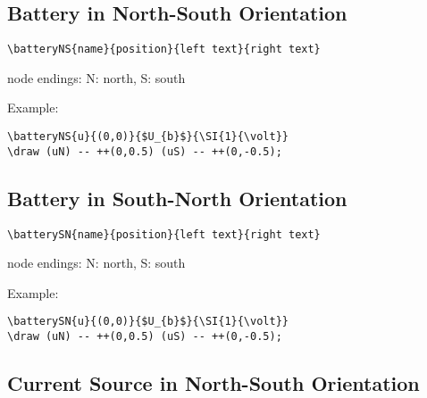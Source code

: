 \documentclass[parskip=full]{scrartcl}
\begin{document}
\subsection{Battery in North-South Orientation}

\begin{verbatim}
\batteryNS{name}{position}{left text}{right text}
\end{verbatim}
node endings: N: north, S: south

Example:\\
\begin{minipage}{0.8\textwidth}
\begin{verbatim}
\batteryNS{u}{(0,0)}{$U_{b}$}{\SI{1}{\volt}}
\draw (uN) -- ++(0,0.5) (uS) -- ++(0,-0.5);
\end{verbatim}
\end{minipage}
\begin{minipage}{0.19\textwidth}
\end{minipage}

\subsection{Battery in South-North Orientation}

\begin{verbatim}
\batterySN{name}{position}{left text}{right text}
\end{verbatim}
node endings: N: north, S: south

Example:\\
\begin{minipage}{0.8\textwidth}
\begin{verbatim}
\batterySN{u}{(0,0)}{$U_{b}$}{\SI{1}{\volt}}
\draw (uN) -- ++(0,0.5) (uS) -- ++(0,-0.5);
\end{verbatim}
\end{minipage}
\begin{minipage}{0.19\textwidth}
\end{minipage}

\subsection{Current Source in North-South Orientation}
\end{document}
